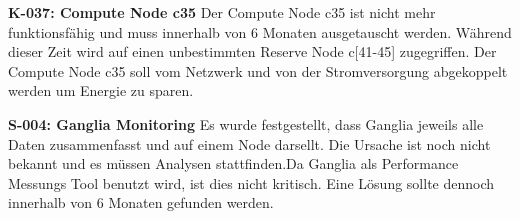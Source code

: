 \textbf{K-037: Compute Node c35} \newline
Der Compute Node c35 ist nicht mehr funktionsfähig und muss innerhalb von 6 Monaten ausgetauscht werden. Während dieser Zeit wird auf einen unbestimmten Reserve Node c[41-45] zugegriffen. Der Compute Node c35 soll vom Netzwerk und von der Stromversorgung abgekoppelt werden um Energie zu sparen. \newline

\textbf{S-004: Ganglia Monitoring} \newline
Es wurde festgestellt, dass Ganglia jeweils alle Daten zusammenfasst und auf einem Node darsellt. Die Ursache ist noch nicht bekannt und es müssen Analysen stattfinden.Da Ganglia als Performance Messungs Tool benutzt wird, ist dies nicht kritisch. Eine Lösung sollte dennoch innerhalb von 6 Monaten gefunden werden.
